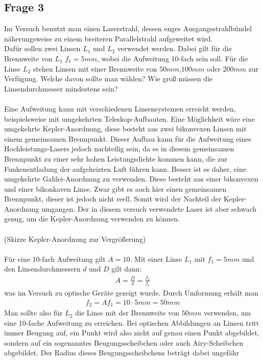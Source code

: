 \documentclass[a4paper,10pt]{scrartcl}
\begin{document}
		\subsection{Frage 3}
			Im Versuch benutzt man einen Laserstrahl, dessen enges Ausgangsstrahlbündel näherungsweise zu einem breiteren Parallelstrahl aufgeweitet wird.\\
			Dafür sollen zwei Linsen \(L_{1}\) und \(L_{2}\) verwendet werden. Dabei gilt für die Brennweite von \(L_{1}\) \(f_{1}=5mm\), wobei die  Aufweitung 10-fach sein soll. Für die Linse \(L_{2}\) stehen Linsen mit einer Brennweite von \(50mm\),\(100mm\) oder \(200mm\) zur Verfügung. Welche davon sollte man wählen? Wie groß müssen die Linsendurchmesser mindestens sein?\\
			\\
			Eine Aufweitung kann mit verschiedenen Linsensystemen erreicht werden, beispielsweise mit umgekehrten Teleskop-Aufbauten. Eine Möglichkeit wäre eine umgekehrte Kepler-Anordnung, diese besteht aus zwei bikonvexen Linsen mit einem gemeinsamen Brennpunkt. Dieser Aufbau kann für die Aufweitung eines Hochleistungs-Lasers jedoch nachteilig sein, da es in diesem gemeinsamen Brennpunkt zu einer sehr hohen Leistungsdichte kommen kann, die zur Funkenentladung der aufgeheizten Luft führen kann. Besser ist es daher, eine umgekehrte Galilei-Anordnung zu verwenden. Diese besteht aus einer bikonvexen und einer bikonkaven Linse. Zwar gibt es auch hier einen gemeinsamen Brennpunkt, dieser ist jedoch nicht reell. 
			Somit wird der Nachteil der Kepler-Anordnung umgangen. Der in diesem versuch verwendete Laser ist aber schwach genug, um die Kepler-Anordnung verwenden zu können.\\
			\\
			(Skizze Kepler-Anordnung zur Vergrößerung)\\
			\\
			Für eine 10-fach Aufweitung gilt \(A=10\). Mit einer Linse \(L_{1}\) mit \(f_{1}=5mm\) und den Linsendurchmessern \(d\) und \(D\) gilt dann:
			\begin{align*}
			A=\frac{D}{d}=\frac{f_{2}}{f_{1}}
			\end{align*}
			was im Versuch zu optische Geräte gezeigt wurde. Durch Umformung erhält man
			\begin{align*}
			f_{2}=Af_{1}=10 \cdot 5mm=50mm
			\end{align*}
			Man sollte also für \(L_{2}\) die Linse mit der Brennweite von \(50mm\) verwenden, um eine 10-fache Aufweitung zu erreichen. Bei optischen Abbildungen an Linsen tritt immer Beugung auf, ein Punkt wird also nicht auf genau einen Punkt abgebildet, sondern auf ein sogenanntes Beugungsscheibchen oder auch Airy-Scheibchen abgebildet. Der Radius dieses Beugungsscheibchens beträgt dabei ungefähr
\end{document}
